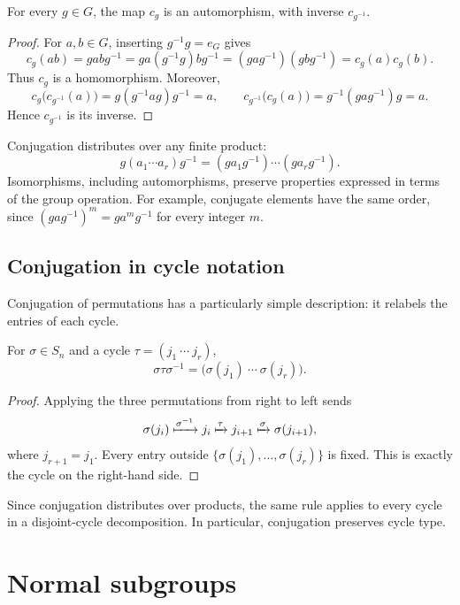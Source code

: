\documentclass[reqno,11pt]{amsart}
\begin{document}
\begin{proposition}
For every $g\in G$, the map $c_g$ is an automorphism, with inverse $c_{g^{-1}}$.
\end{proposition}
\begin{proof}
For $a,b\in G$, inserting $g^{-1}g=e_G$ gives
\[
  c_g(ab)=gabg^{-1}=ga(g^{-1}g)bg^{-1}
  =(gag^{-1})(gbg^{-1})=c_g(a)c_g(b).
\]
Thus $c_g$ is a homomorphism. Moreover,
\[
  c_g\bigl(c_{g^{-1}}(a)\bigr)=g(g^{-1}ag)g^{-1}=a,
  \qquad
  c_{g^{-1}}\bigl(c_g(a)\bigr)=g^{-1}(gag^{-1})g=a.
\]
Hence $c_{g^{-1}}$ is its inverse.
\end{proof}

\begin{remark}
Conjugation distributes over any finite product:
\[
  g(a_1\cdots a_r)g^{-1}=(ga_1g^{-1})\cdots(ga_rg^{-1}).
\]
Isomorphisms, including automorphisms, preserve properties expressed in
terms of the group operation. For example, conjugate elements have the
same order, since $(gag^{-1})^m=ga^mg^{-1}$ for every integer $m$.
\end{remark}


\subsection*{Conjugation in cycle notation}

Conjugation of permutations has a particularly simple description:
it relabels the entries of each cycle.

\begin{proposition}
	For $\sigma\in S_n$ and a cycle $\tau=(j_1\ \cdots\ j_r)$,
	\begin{equation}
		\sigma\tau\sigma^{-1}
		=\bigl(\sigma(j_1)\ \cdots\ \sigma(j_r)\bigr).
	\end{equation}
\end{proposition}
\begin{proof}
	Applying the three permutations from right to left sends
	\[
	\sigma(j_i)\xmapsto{\sigma^{-1}}j_i
	\xmapsto{\tau}j_{i+1}
	\xmapsto{\sigma}\sigma(j_{i+1}),
	\]
	where $j_{r+1}=j_1$. Every entry outside
	$\{\sigma(j_1),\ldots,\sigma(j_r)\}$ is fixed. This is exactly the cycle
	on the right-hand side.
\end{proof}

Since conjugation distributes over products, the same rule applies to
every cycle in a disjoint-cycle decomposition. In particular, conjugation
preserves cycle type.


\section{Normal subgroups}
\end{document}
